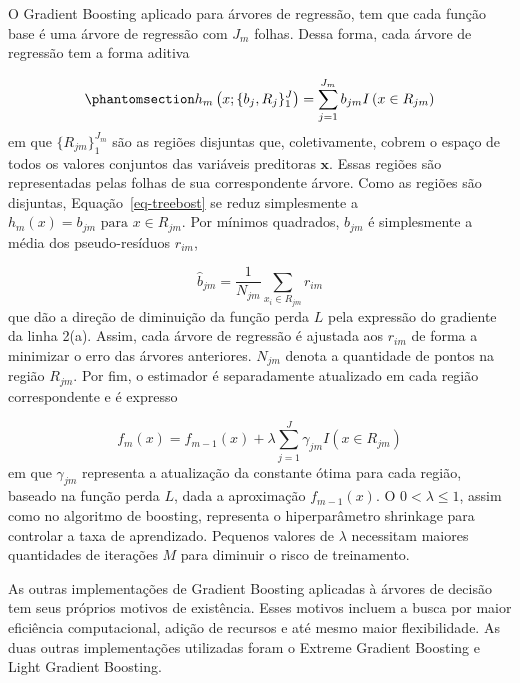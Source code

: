 \documentclass[
  12pt,
  a4paper,
]{scrreprt}
\begin{document}
\vspace{12pt}

O Gradient Boosting aplicado para árvores de regressão, tem que cada
função base é uma árvore de regressão com \(J_m\) folhas. Dessa forma,
cada árvore de regressão tem a forma aditiva

\begin{equation}\phantomsection\label{eq-treebost}{
h_m\left(x;\{b_j, R_j\}^J_{1}\right) = \sum^{J_m}_{j = 1} b_{jm} I\left(x \in R_{jm}\right)
}\end{equation} em que \(\{R_{jm}\}^{J_m}_{1}\) são as regiões disjuntas
que, coletivamente, cobrem o espaço de todos os valores conjuntos das
variáveis preditoras \(\mathbf{x}\). Essas regiões são representadas
pelas folhas de sua correspondente árvore. Como as regiões são
disjuntas, Equação~\ref{eq-treebost} se reduz simplesmente a
\(h_m\left(x\right) = b_{jm}\text{ para } x \in  R_{jm}\). Por mínimos
quadrados, \(b_{jm}\) é simplesmente a média dos pseudo-resíduos
\(r_{im}\),

\[
\hat{b}_{jm} = \frac{1}{N_{jm}} \sum_{x_i \in R_{jm}} r_{im}
\] que dão a direção de diminuição da função perda \(L\) pela expressão
do gradiente da linha 2(a). Assim, cada árvore de regressão é ajustada
aos \(r_{im}\) de forma a minimizar o erro das árvores anteriores.
\(N_{jm}\) denota a quantidade de pontos na região \(R_{jm}\). Por fim,
o estimador é separadamente atualizado em cada região correspondente e é
expresso

\[
f_m\left(x\right) = f_{m - 1}\left(x\right) + \lambda \sum^{J}_{j = 1} \gamma_{jm} I\left(x \in R_{jm}\right)
\] em que \(\gamma_{jm}\) representa a atualização da constante ótima
para cada região, baseado na função perda \(L\), dada a aproximação
\(f_{m-1}\left(x\right)\). O \(0 < \lambda \leq 1\), assim como no
algoritmo de boosting, representa o hiperparâmetro shrinkage para
controlar a taxa de aprendizado. Pequenos valores de \(\lambda\)
necessitam maiores quantidades de iterações \(M\) para diminuir o risco
de treinamento.

\vspace{12pt}

As outras implementações de Gradient Boosting aplicadas à árvores de
decisão tem seus próprios motivos de existência. Esses motivos incluem a
busca por maior eficiência computacional, adição de recursos e até mesmo
maior flexibilidade. As duas outras implementações utilizadas foram o
Extreme Gradient Boosting e Light Gradient Boosting.

\vspace{12pt}
\end{document}
